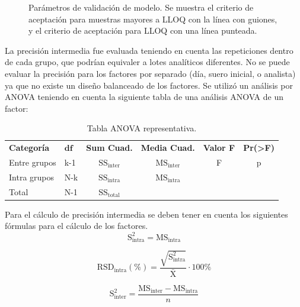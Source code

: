 \documentclass{article}
\begin{document}
\begin{figure}[h]
	\caption{Parámetros de validación de modelo. Se muestra el criterio de aceptación para muestras mayores a LLOQ con la línea con guiones, y el criterio de aceptación para LLOQ con una línea punteada.}
	\label{Fig:RSD}
\end{figure}

\noindent
La precisión intermedia fue evaluada teniendo en cuenta las repeticiones dentro de cada grupo, que podrían equivaler a lotes analíticos diferentes. No se puede evaluar la precisión para los factores por separado (día, suero inicial, o analista) ya que no existe un diseño balanceado de los factores. Se utilizó un análisis por ANOVA teniendo en cuenta la siguiente tabla de una análisis ANOVA de un factor: \\

\begin{table}[H]
	\centering
\begin{tabular}{llcccc}
	\hline
	\multirow{2}{*}{\textbf{Categoría}} & \multirow{2}{*}{$\mathbf{df}$} & \multirow{2}{*}{\textbf{Sum Cuad.}} & \multirow{2}{*}{\textbf{Media Cuad.}} & \multirow{2}{*}{\textbf{Valor F}} & \multirow{2}{*}{\textbf{Pr(>F)}} \\ &  &  &  &  & \\
	\hline
	Entre grupos & k-1 & $\mathrm{SS_{inter}}$ & $\mathrm{MS_{inter}}$ & F & p        \\

	Intra grupos & N-k & $\mathrm{SS_{intra}}$ & $\mathrm{MS_{intra}}$ &  & \\
	Total & N-1 & $\mathrm{SS_{total}}$ &  &  & \\ \hline
\end{tabular}
\caption{Tabla ANOVA representativa.}
\label{Cuadro:4}
\end{table}

\noindent
Para el cálculo de precisión intermedia se deben tener en cuenta los siguientes fórmulas para el cálculo de los factores.\\

\begin{equation}\label{Eq:3}
	\mathrm{S^{2}_{intra}} = \mathrm{MS_{intra}}
\end{equation}

\begin{equation}\label{Eq:4}
\mathrm{RSD_{intra}(\%)} = \frac{\sqrt{\mathrm{S^{2}_{intra}}}}{\bar{\mathrm{X}}}\cdot 100\%
\end{equation}

\begin{equation}\label{Eq:5}
\mathrm{S^{2}_{inter}} = \frac{\mathrm{MS_{inter}}-\mathrm{MS_{intra}}}{n}
\end{equation}
\end{document}
